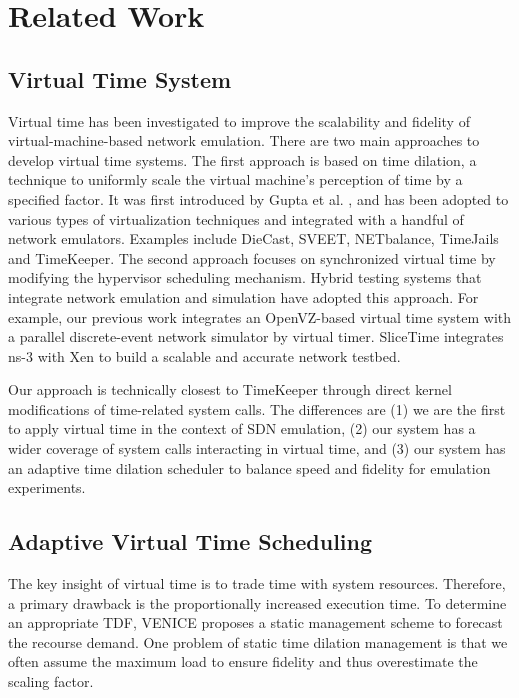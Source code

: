 \section{Related Work}
\label{Sec-RelatedWorks}

\subsection{Virtual Time System}
Virtual time has been investigated to improve the scalability and fidelity of virtual-machine-based network emulation. There are two main approaches to develop virtual time systems. The first approach is based on time dilation, a technique to uniformly scale the virtual machine's perception of time by a specified factor. It was first introduced by Gupta et al. \cite{ToInfinityBeyond}, and has been adopted to various types of virtualization techniques and integrated with a handful of network emulators. Examples include DieCast\cite{DieCast}, SVEET\cite{SVEET}, NETbalance\cite{NETbalance}, TimeJails\cite{ComparisonVR-VM, TimeJails} and TimeKeeper\cite{TimeKeeper}. The second approach focuses on synchronized virtual time by modifying the hypervisor scheduling mechanism. Hybrid testing systems that integrate network emulation and simulation have adopted this approach. For example, our previous work\cite{jin2012virtual} integrates an OpenVZ-based virtual time system \cite{VirtTimeOpenVZ} with a parallel discrete-event network simulator by virtual timer.
SliceTime\cite{SliceTime} integrates ns-3\cite{NS-3} with Xen to build a scalable and accurate network testbed.

Our approach is technically closest to TimeKeeper \cite{TimeKeeper} through direct kernel modifications of time-related system calls. The differences are (1) we are the first to apply virtual time in the context of SDN emulation, (2) our system has a wider coverage of system calls interacting in virtual time, and (3) our system has an adaptive time dilation scheduler to balance speed and fidelity for emulation experiments.

\subsection{Adaptive Virtual Time Scheduling}
The key insight of virtual time is to trade time with system resources. Therefore, a primary drawback is the proportionally increased execution time. To determine an appropriate TDF, VENICE \cite{VirtualTimeMachine} proposes a static management scheme to forecast the recourse demand. One problem of static time dilation management is that we often assume the maximum load to ensure fidelity and thus overestimate the scaling factor. 

